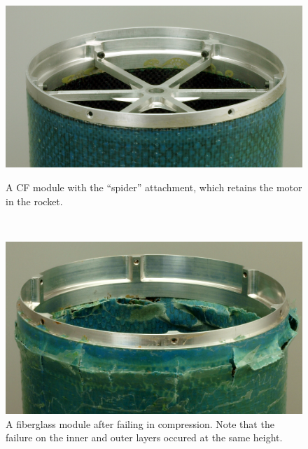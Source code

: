 \documentclass{aiaa-tc}%
\begin{document}
\begin{figure}
	\centering
	\parbox{0.45\linewidth}
	{
		\includegraphics[width=\linewidth]{../img/moduleWithSpider.png}
		\caption{A CF module with the ``spider'' attachment, which retains the motor in the rocket.}
		\label{fig:module}
	}
	~
	\parbox{0.45\linewidth}
	{
		\includegraphics[width=\linewidth]{../img/FG_fracture.JPG}
		\caption{A fiberglass module after failing in compression. Note that the failure on the inner and outer layers occured at the same height.}
		\label{fig:crush}
	}
\end{figure}
\end{document}
